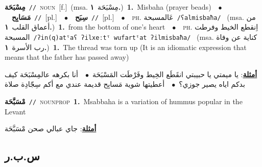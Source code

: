 \documentclass[10pt,a4paper,twoside]{article} %
\begin{document}
\begin{multicols}{2}
{\setlength\topsep{0pt}\textbf{\foreignlanguage{arabic}{مِسْبَحَة}}\ {\color{gray}\texttt{//}\color{black}}\ \textsc{noun}\ [f.]\ \color{gray}(msa. \foreignlanguage{arabic}{مِسْبَحَة}~\foreignlanguage{arabic}{\textbf{١.}})\color{black}\ \textbf{1.}~Misbaha (prayer beads)\ \ $\bullet$\ \ \setlength\topsep{0pt}\textbf{\foreignlanguage{arabic}{مَسَابِح}}\ {\color{gray}\texttt{//}\color{black}}\ [pl.]\ \ $\bullet$\ \ \setlength\topsep{0pt}\textbf{\foreignlanguage{arabic}{سِبَح}}\ {\color{gray}\texttt{//}\color{black}}\ [pl.]\ \ $\bullet$\ \ \textsc{ph.} \color{gray} \foreignlanguage{arabic}{عَالمسبحة}\color{black}\ {\color{gray}\texttt{/{\sffamily ʕalmisbaħa}/}\color{black}}\ \color{gray} (msa. \foreignlanguage{arabic}{من أعماق القلب}~\foreignlanguage{arabic}{\textbf{١.}})\color{black}\ \textbf{1.}~from the bottom of one's heart\ \ $\bullet$\ \ \textsc{ph.} \color{gray} \foreignlanguage{arabic}{اِنقطع الخيط وفرطت المسبحة}\color{black}\ {\color{gray}\texttt{/{\sffamily ʔin(q)atˤaʕ ʔilxeːtˤ wufartˤat ʔilmisbaħa}/}\color{black}}\ \color{gray} (msa. \foreignlanguage{arabic}{كناية عن وفاة رب الأسرة}~\foreignlanguage{arabic}{\textbf{١.}})\color{black}\ \textbf{1.}~The thread was torn up (It is an idiomatic expression that means that the father has passed away)\  \begin{flushright}\color{gray}\foreignlanguage{arabic}{\textbf{\underline{\foreignlanguage{arabic}{أمثلة}}}: يا ميمتي يا حبيبتي انقَطَع الخِيط وفَرْطَت المَسْبَحَة\ $\bullet$\ \  أنا بكرهه عالمِسْبَحَة كيف بدكم اياه يصير جوزي؟\ $\bullet$\ \  أعطيتها شوية مَسابِح قديمة عندي مع أكم سِجّادِة صلاة}\end{flushright}\color{black}} \vspace{2mm}

{\setlength\topsep{0pt}\textbf{\foreignlanguage{arabic}{مْسَبَّحَة}}\ {\color{gray}\texttt{//}\color{black}}\ \textsc{noun\textunderscore prop}\ \textbf{1.}~Msabbaha is a variation of hummus popular in the Levant\  \begin{flushright}\color{gray}\foreignlanguage{arabic}{\textbf{\underline{\foreignlanguage{arabic}{أمثلة}}}: جاي عبالي صحن مْسَبَّحَة}\end{flushright}\color{black}} \vspace{2mm}

\vspace{-3mm}
\subsection*{\color{blue}\foreignlanguage{arabic}{س.ب.ر}\color{blue}{}} 


\end{multicols}
\end{document}
